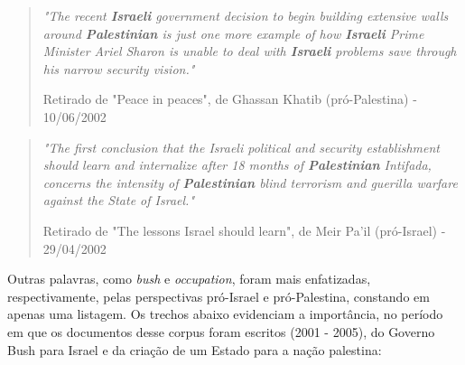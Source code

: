 \begin{quote}

\emph{"The recent \textbf{Israeli} government decision to begin building extensive walls
around \textbf{Palestinian} is just one more example of how \textbf{Israeli} Prime
Minister Ariel Sharon is unable to deal with \textbf{Israeli} problems save
through his narrow security vision."}

{\small Retirado de "Peace in peaces", de Ghassan Khatib (pró-Palestina) - 10/06/2002}
\end{quote}

\begin{quote}

\emph{"The first conclusion that the Israeli political and security
establishment should learn and internalize after 18 months of
\textbf{Palestinian} Intifada, concerns the intensity of \textbf{Palestinian} blind
terrorism and guerilla warfare against the State of Israel."}

{\small Retirado de "The lessons Israel should learn", de Meir Pa'il (pró-Israel) - 29/04/2002}
\end{quote}



Outras palavras, como \emph{bush} e \emph{occupation}, foram mais enfatizadas, respectivamente, pelas perspectivas pró-Israel e pró-Palestina, constando em apenas uma listagem. Os trechos abaixo evidenciam a importância, no período em que os documentos desse corpus foram escritos (2001 - 2005), do Governo Bush para Israel e da criação de um Estado para a nação palestina:




